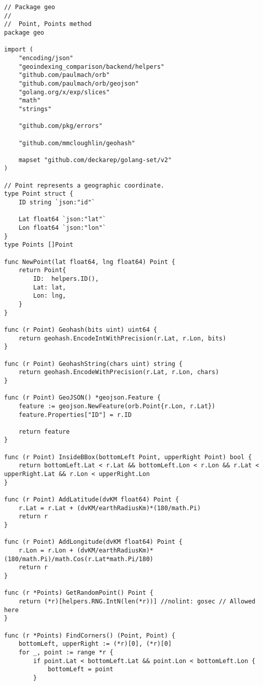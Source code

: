     
\begin{lstlisting}[caption=points.go]
// Package geo
//
//	Point, Points method
package geo

import (
	"encoding/json"
	"geoindexing_comparison/backend/helpers"
	"github.com/paulmach/orb"
	"github.com/paulmach/orb/geojson"
	"golang.org/x/exp/slices"
	"math"
	"strings"

	"github.com/pkg/errors"

	"github.com/mmcloughlin/geohash"

	mapset "github.com/deckarep/golang-set/v2"
)

// Point represents a geographic coordinate.
type Point struct {
	ID string `json:"id"`

	Lat float64 `json:"lat"`
	Lon float64 `json:"lon"`
}
type Points []Point

func NewPoint(lat float64, lng float64) Point {
	return Point{
		ID:  helpers.ID(),
		Lat: lat,
		Lon: lng,
	}
}

func (r Point) Geohash(bits uint) uint64 {
	return geohash.EncodeIntWithPrecision(r.Lat, r.Lon, bits)
}

func (r Point) GeohashString(chars uint) string {
	return geohash.EncodeWithPrecision(r.Lat, r.Lon, chars)
}

func (r Point) GeoJSON() *geojson.Feature {
	feature := geojson.NewFeature(orb.Point{r.Lon, r.Lat})
	feature.Properties["ID"] = r.ID

	return feature
}

func (r Point) InsideBBox(bottomLeft Point, upperRight Point) bool {
	return bottomLeft.Lat < r.Lat && bottomLeft.Lon < r.Lon && r.Lat < upperRight.Lat && r.Lon < upperRight.Lon
}

func (r Point) AddLatitude(dvKM float64) Point {
	r.Lat = r.Lat + (dvKM/earthRadiusKm)*(180/math.Pi)
	return r
}

func (r Point) AddLongitude(dvKM float64) Point {
	r.Lon = r.Lon + (dvKM/earthRadiusKm)*(180/math.Pi)/math.Cos(r.Lat*math.Pi/180)
	return r
}

func (r *Points) GetRandomPoint() Point {
	return (*r)[helpers.RNG.IntN(len(*r))] //nolint: gosec // Allowed here
}

func (r *Points) FindCorners() (Point, Point) {
	bottomLeft, upperRight := (*r)[0], (*r)[0]
	for _, point := range *r {
		if point.Lat < bottomLeft.Lat && point.Lon < bottomLeft.Lon {
			bottomLeft = point
		}


\end{lstlisting}
